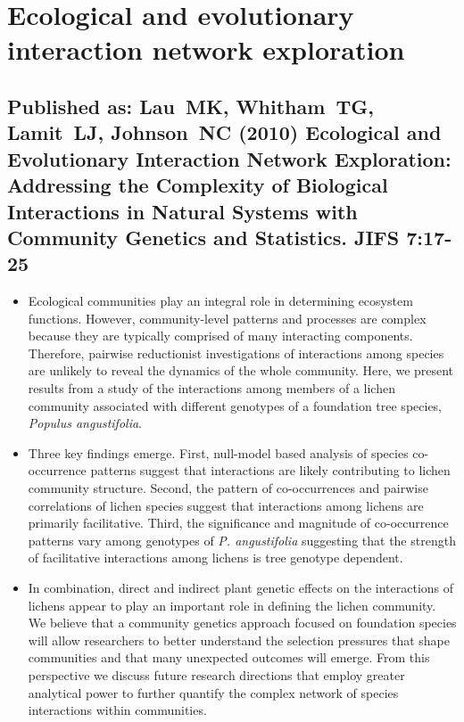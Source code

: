 \documentclass[12pt]{article}
\begin{document}
\section{Ecological and evolutionary interaction network exploration}

\subsection{\textbf{Published as:} Lau\ MK, Whitham\ TG, Lamit\ LJ, Johnson\ NC
(2010) Ecological and Evolutionary Interaction Network Exploration:
Addressing the Complexity of Biological Interactions in Natural
Systems with Community Genetics and Statistics. JIFS 7:17-25}

\begin{itemize}
\item Ecological communities play an integral role in determining
  ecosystem functions. However, community-level patterns and processes
  are complex because they are typically comprised of many interacting
  components. Therefore, pairwise reductionist investigations  of
  interactions among species are unlikely to reveal the dynamics of
  the whole community. Here, we present results from a study of the
  interactions among members of a lichen community associated with
  different genotypes of a foundation tree species, \textit{Populus
    angustifolia}.  

\item Three key findings emerge. First, null-model based analysis of
  species co-occurrence patterns suggest that interactions are likely
  contributing to lichen community structure. Second, the pattern of
  co-occurrences and pairwise correlations of lichen species suggest
  that interactions among lichens are primarily facilitative. Third,
  the significance and magnitude of co-occurrence patterns vary among
  genotypes of \textit{P. angustifolia} suggesting that the strength of
  facilitative interactions among lichens is tree genotype dependent.  

\item In combination, direct and indirect plant genetic effects on the
  interactions of lichens appear to play an important role in defining
  the lichen community. We believe that a community genetics approach
  focused on foundation species will allow researchers to better
  understand the selection pressures that shape communities and that
  many unexpected outcomes will emerge. From this perspective we
  discuss future research directions that employ greater analytical
  power to further quantify the complex network of species
  interactions within communities.
\end{itemize}
\end{document}
